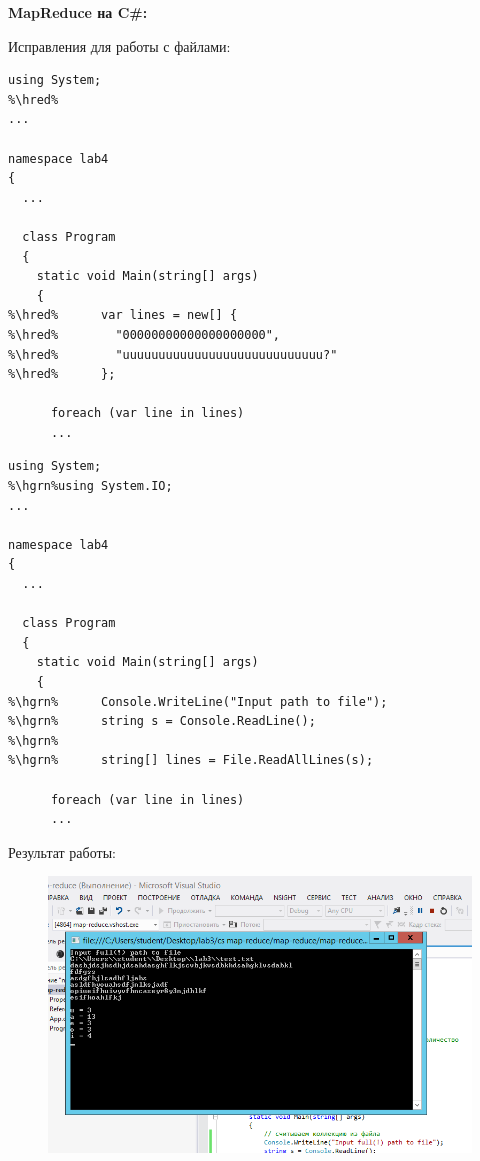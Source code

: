 \documentclass[pscyr,10pt]{hedlab}
\date{25 ноября 2014 г.}
\newcommand{\hred}{\makebox[0pt][l]{\color{gred}\rule[-2pt]{\linewidth}{10pt}}}
\newcommand{\hgrn}{\makebox[0pt][l]{\color{ggrn}\rule[-2pt]{\linewidth}{10pt}}}
\begin{document}
  \makeheader
  
  \begin{center}
    \textbf{MapReduce на C\#:}
  \end{center}
  
  Исправления для работы с файлами:\\
  \begin{minipage}{.45\textwidth}
  \begin{lstlisting}
using System;
%\hred%
...
 
namespace lab4 
{
  ... 
 
  class Program 
  { 
    static void Main(string[] args) 
    {
%\hred%      var lines = new[] { 
%\hred%        "00000000000000000000", 
%\hred%        "uuuuuuuuuuuuuuuuuuuuuuuuuuuu?" 
%\hred%      };
 
      foreach (var line in lines) 
      ...
  \end{lstlisting}
  \end{minipage} \hfill
  \begin{minipage}{.45\textwidth}
  \begin{lstlisting}
using System;
%\hgrn%using System.IO;
...
 
namespace lab4 
{
  ... 
 
  class Program 
  { 
    static void Main(string[] args) 
    {
%\hgrn%      Console.WriteLine("Input path to file");
%\hgrn%      string s = Console.ReadLine();
%\hgrn%
%\hgrn%      string[] lines = File.ReadAllLines(s);
 
      foreach (var line in lines) 
      ...
  \end{lstlisting}
  \end{minipage}

  Результат работы:
  \begin{figure}[h!]
    \center
    \includegraphics[width=.95\textwidth]{00}
  \end{figure}
  
\end{document}
